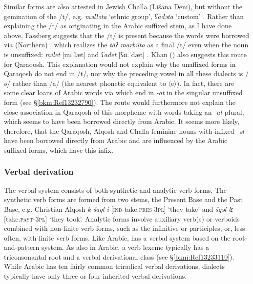 \documentclass[output=paper]{langsci/langscibook}
\begin{document}
Similar forms are also attested in Jewish Challa (Lišāna Deni), but without the gemination of the /t/, e.g. \textit{məlləta} ‘ethnic group’, \textit{ʕādəta} ‘custom’ \citep[52]{Fassberg2010}. Rather than explaining the /t/ as originating in the Arabic suffixed {stem}, as I have done above, Fassberg suggests that the /t/ is present because the words were borrowed via ({Northern}) , which realizes the \textit{tāʔ} \textit{marbūṭa} as a final /t/ even when the noun is unsuffixed: \textit{milet} [mɪˈlæt] and \textit{ʕadet} [ʕɑːˈdæt] \citep[387]{Chyet2003}. Khan (\citeyear[206]{Khan2002}) also suggests this route for Qaraqosh. This explanation would not explain why the unaffixed forms in Qaraqosh do not end in /t/, nor why the preceding vowel in all these dialects is /ə/ rather than /a/ (the nearest phonetic equivalent to  〈e〉). In fact, there are some clear loans of Arabic words via  which end in \textit{{}-at} in the singular unsuffixed form (see §\ref{bkm:Ref13232790}). The  route would furthermore not explain the close association in Qaraqosh of this morpheme with words taking an \textit{\nobreakdash-at} plural, which seems to have been borrowed directly from Arabic. It seems more likely, therefore, that the Qaraqosh, Alqosh and Challa feminine nouns with infixed \textit{\nobreakdash-ət\nobreakdash-} have been borrowed directly from Arabic and are influenced by the Arabic suffixed forms, which have this infix.



\subsubsection{\label{bkm:Ref13233345}Verbal derivation}

The  verbal system consists of both synthetic and analytic verb forms. The synthetic verb forms are formed from two stems, the Present Base and the Past Base, e.g. Christian Alqosh \textit{k\nobreakdash-šaql\nobreakdash-i} [\textsc{ind\nobreakdash-}take.\textsc{pres\nobreakdash-3pl]} ‘they take’ and \textit{šqəl\nobreakdash-lɛ} [take.\textsc{past\nobreakdash-3pl}] ‘they took’. Analytic forms involve {auxiliary verb(s)} or verboids combined with non-finite verb forms, such as the {infinitive} or participles, or, less often, with finite verb forms. Like Arabic,  has a verbal system based on the {root-and-pattern} system. As also in Arabic, a verb lexeme typically has a {triconsonantal} {root} and a verbal {derivational} class (see §\ref{bkm:Ref13233110}). While  Arabic has ten fairly common triradical verbal derivations,  dialects typically have only three or four inherited verbal derivations.
\end{document}
